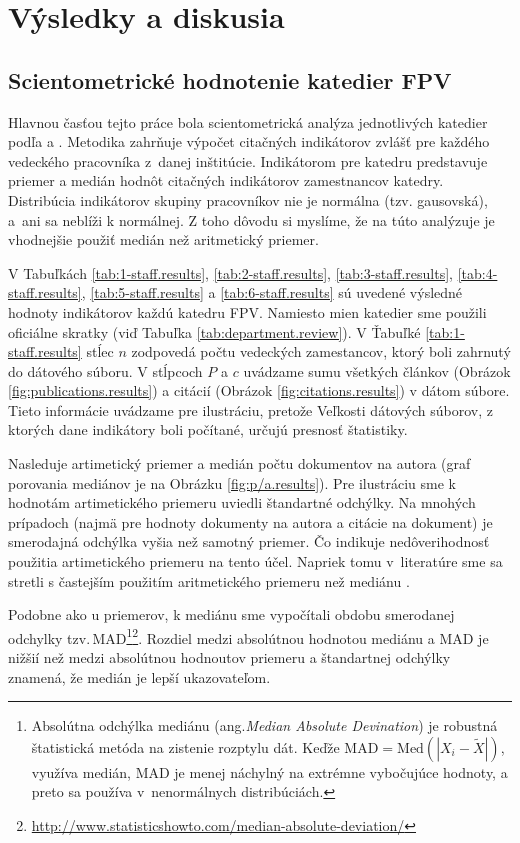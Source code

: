 \chapter{Výsledky a diskusia}

\section{Scientometrické hodnotenie katedier FPV}

Hlavnou časťou tejto práce bola scientometrická analýza jednotlivých katedier
podľa \citet{Kazakis2014a} a \citet{Kazakis2014b,Kazakis2015}. Metodika zahrňuje
výpočet citačných indikátorov zvlášť pre každého vedeckého pracovníka 
z~danej inštitúcie. Indikátorom pre katedru predstavuje priemer a medián 
hodnôt citačných indikátorov zamestnancov katedry. 
Distribúcia indikátorov skupiny pracovníkov nie je normálna (tzv. gausovská), 
a~ani sa neblíži k normálnej. Z toho dôvodu si myslíme, že na túto analýzuje je
vhodnejšie použiť medián než aritmetický priemer.  

V Tabuľkách  \ref{tab:1-staff.results}, \ref{tab:2-staff.results},
\ref{tab:3-staff.results}, \ref{tab:4-staff.results}, \ref{tab:5-staff.results}
a \ref{tab:6-staff.results} sú uvedené výsledné hodnoty indikátorov každú
katedru FPV.  Namiesto mien katedier sme použili oficiálne skratky (viď Tabuľka
\ref{tab:department.review}).  V Ťabuľké \ref{tab:1-staff.results} stĺec $n$
zodpovedá počtu vedeckých zamestancov, ktorý boli zahrnutý do dátového súboru.
V stĺpcoch $P$ a $c$ uvádzame sumu všetkých článkov (Obrázok
\ref{fig:publications.results}) a citácií (Obrázok \ref{fig:citations.results})
v dátom súbore.  Tieto informácie uvádzame pre ilustráciu, pretože Veľkosti
dátových súborov, z ktorých dane indikátory boli počítané, určujú presnosť
štatistiky. 

Nasleduje artimetický priemer a medián počtu dokumentov na autora (graf
porovania mediánov je na Obrázku \ref{fig:p/a.results}).  Pre ilustráciu sme k
hodnotám artimetického priemeru uviedli štandartné odchýlky.  Na mnohých
prípadoch (najmä pre hodnoty  dokumenty na autora a citácie na dokument)
je smerodajná odchýlka vyšia než samotný priemer. Čo indikuje nedôverihodnosť
použitia artimetického priemeru na tento účel. Napriek tomu v~literatúre sme sa
stretli s častejším použitím aritmetického priemeru než mediánu
\citep{Lazaridis2010}.  

Podobne ako u priemerov, k mediánu sme vypočítali obdobu smerodanej odchylky
tzv.\,MAD\footnote{Absolútna odchýlka mediánu
(ang.\emph{Median Absolute Devination}) je robustná štatistická metóda na
zistenie rozptylu dát. Keďže $\mathrm{MAD} = \mathrm{Med}(|X_i - \tilde{X}|)$,
využíva medián, MAD je menej náchylný na extrémne vybočujúce hodnoty, a preto
sa používa v~nenormálnych
distribúciách.}\footnote{\url{http://www.statisticshowto.com/median-absolute-deviation/}}.
Rozdiel medzi absolútnou hodnotou mediánu a MAD je nižšií 
než medzi absolútnou hodnoutov priemeru a štandartnej odchýlky znamená, že
medián je lepší ukazovateľom.

